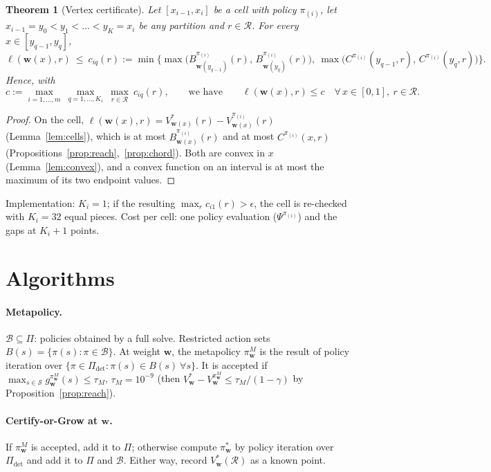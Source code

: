 \documentclass[11pt]{article}
\newcommand{\w}{\mathbf{w}}
\newcommand{\cS}{\mathcal S}
\newcommand{\cR}{\mathcal R}
\newtheorem{theorem}{Theorem}
\theoremstyle{definition}
\begin{document}
\begin{theorem}[Vertex certificate]\label{thm:cert}
Let $[x_{i-1},x_i]$ be a cell with policy $\pi_{(i)}$, let $x_{i-1}=y_0<y_1<\dots<y_K=x_i$ be any partition and
$r\in\cR$. For every $x\in[y_{q-1},y_q]$,
\[
\ell(\w(x),r)\ \le\ c_{iq}(r):=\min\Big\{\max\big(B^{\pi_{(i)}}_{\w(y_{q-1})}(r),\,B^{\pi_{(i)}}_{\w(y_q)}(r)\big),\
\max\big(C^{\pi_{(i)}}(y_{q-1},r),\,C^{\pi_{(i)}}(y_q,r)\big)\Big\}.
\]
Hence, with
\[
c:=\max_{i=1,\dots,m}\ \max_{q=1,\dots,K_i}\ \max_{r\in\cR}\ c_{iq}(r),
\qquad\text{we have}\qquad \ell(\w(x),r)\le c\quad\forall\,x\in[0,1],\ r\in\cR.
\]
\end{theorem}
\begin{proof}
On the cell, $\ell(\w(x),r)=V^*_{\w(x)}(r)-V^{\pi_{(i)}}_{\w(x)}(r)$ (Lemma~\ref{lem:cells}), which is at most
$B^{\pi_{(i)}}_{\w(x)}(r)$ and at most $C^{\pi_{(i)}}(x,r)$ (Propositions~\ref{prop:reach},~\ref{prop:chord}). Both
are convex in $x$ (Lemma~\ref{lem:convex}), and a convex function on an interval is at most the maximum of its
two endpoint values.
\end{proof}

\noindent Implementation: $K_i=1$; if the resulting $\max_r c_{i1}(r)>\epsilon$, the cell is re-checked with
$K_i=32$ equal pieces. Cost per cell: one policy evaluation ($\Psi^{\pi_{(i)}}$) and the gaps at $K_i+1$ points.

\section{Algorithms}\label{sec:alg}

\paragraph{Metapolicy.} $\mathcal B\subseteq\Pi$: policies obtained by a full solve. Restricted action sets
$B(s)=\{\pi(s):\pi\in\mathcal B\}$. At weight $\w$, the metapolicy $\pi^M_\w$ is the result of policy iteration
over $\{\pi\in\Pi_{\det}:\pi(s)\in B(s)\ \forall s\}$. It is accepted if $\max_{s\in\cS}g^{\pi^M_\w}_\w(s)\le\tau_M$,
$\tau_M=10^{-9}$ (then $V^*_\w-V^{\pi^M_\w}_\w\le\tau_M/(1-\gamma)$ by Proposition~\ref{prop:reach}).

\paragraph{Certify-or-Grow at $\w$.} If $\pi^M_\w$ is accepted, add it to $\Pi$; otherwise compute $\pi^*_\w$ by
policy iteration over $\Pi_{\det}$ and add it to $\Pi$ and $\mathcal B$. Either way, record $V^*_\w(\cR)$ as a known
point.
\end{document}
